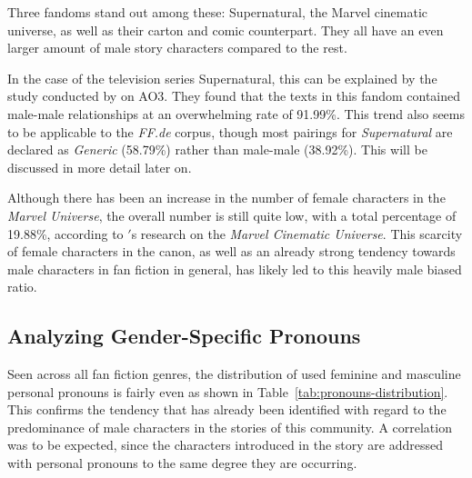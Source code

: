 Three fandoms stand out among these: Supernatural, the Marvel cinematic universe, as well as their carton and comic counterpart.
They all have an even larger amount of male story characters compared to the rest.

In the case of the television series Supernatural, this can be explained by the study conducted by \citet{Kleindienst2020InvestigatingSupernatural} on AO3.
They found that the texts in this fandom contained male-male relationships at an overwhelming rate of 91.99\%.
This trend also seems to be applicable to the \emph{FF.de} corpus, though most pairings for \emph{Supernatural} are declared as \emph{Generic} (58.79\%) rather than male-male (38.92\%).
This will be discussed in more detail later on.

Although there has been an increase in the number of female characters in the \emph{Marvel Universe}, the overall number is still quite low, with a total percentage of 19.88\%, according to \citet{Ray2020GenderViolence}$'$s research on the \emph{Marvel Cinematic Universe}.
This scarcity of female characters in the canon, as well as an already strong tendency towards male characters in fan fiction in general, has likely led to this heavily male biased ratio.

\subsection{Analyzing Gender-Specific Pronouns}\label{subsec:analyzing-gender-specific-pronouns}

Seen across all fan fiction genres, the distribution of used feminine and masculine personal pronouns is fairly even as shown in Table~\ref{tab:pronouns-distribution}.
This confirms the tendency that has already been identified with regard to the predominance of male characters in the stories of this community.
A correlation was to be expected, since the characters introduced in the story are addressed with personal pronouns to the same degree they are occurring.

